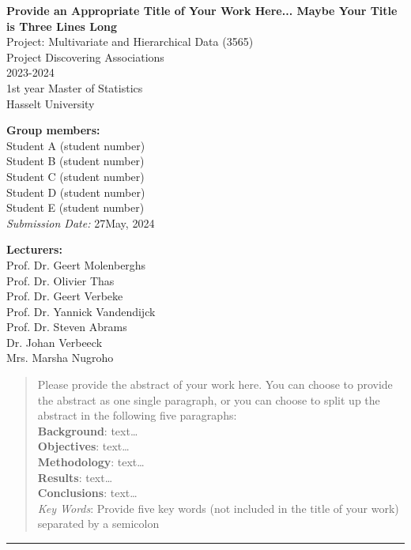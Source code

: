 \documentclass[11pt]{article}
\begin{document}
\clearpage\thispagestyle{empty}

\begin{center}
	\textbf{\huge{Provide an Appropriate Title of Your Work Here... Maybe Your Title is Three Lines Long}} \\[1.5cm]
	\Large{
	Project: Multivariate and Hierarchical Data (3565) \\
	Project Discovering Associations \\
	2023-2024 \\[0.5cm]
	1st year Master of Statistics \\
	Hasselt University	
	}
\end{center}

\vspace*{1cm}
\textbf{\large{Group members:}}\\
Student A (student number) \\
Student B (student number) \\
Student C (student number) \\
Student D (student number) \\
Student E (student number) \\[0.5cm]

\noindent\textit{Submission Date:} 27May, 2024

\vspace*{2.5cm}
\textbf{\large{Lecturers:}}\\
Prof. Dr. Geert Molenberghs \\
Prof. Dr. Olivier Thas \\
Prof. Dr. Geert Verbeke \\
Prof. Dr. Yannick Vandendijck \\
Prof. Dr. Steven Abrams \\
Dr. Johan Verbeeck \\
Mrs. Marsha Nugroho


\newpage \setcounter{page}{1}

\begin{abstract}
Please provide the abstract of your work here. You can choose to provide the abstract as one single paragraph, or you can choose to split up the abstract in the following five paragraphs:\\

\noindent\textbf{Background}: text\ldots \\

\noindent\textbf{Objectives}: text\ldots  \\

\noindent\textbf{Methodology}: text\ldots  \\

\noindent\textbf{Results}: text\ldots  \\

\noindent\textbf{Conclusions}: text\ldots  \\

\noindent\textit{Key Words}: Provide five key words (not included in the title of your work) separated by a semicolon 

\end{abstract}
\rule{\textwidth}{0.4pt}
\end{document}

